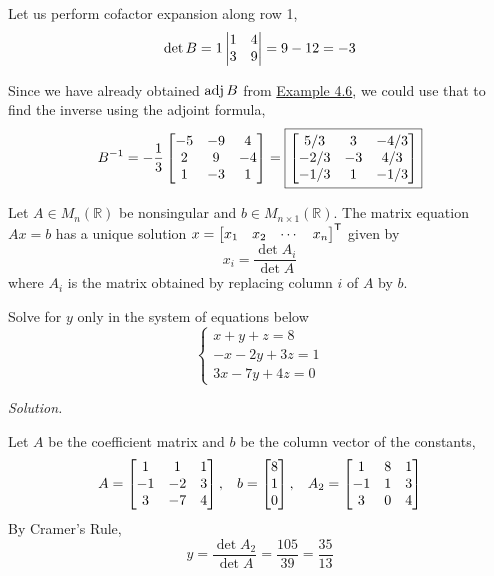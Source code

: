 Let us perform cofactor expansion along row 1,
$$\det B = 1 \begin{vmatrix} 1 & 4 \\ 3 & 9 \end{vmatrix} = 9 - 12 = -3$$

Since we have already obtained $\operatorname{adj} B$ from \hyperref[example:4.6]{Example 4.6}, we could use that to find the inverse using the adjoint formula,
$$B^{-1} = -\frac{1}{3}\begin{bmatrix} -5 & -9 & 4 \\ 2 & 9 & -4 \\ 1 & -3 & 1 \end{bmatrix}=\boxed{\begin{bmatrix} 5/3 & 3 & -4/3 \\ -2/3 & -3 & 4/3 \\ -1/3 & 1 & -1/3 \end{bmatrix}}$$

\begin{theorem}
Let $A \in M_n(\mathbb{R})$ be nonsingular and $b \in M_{n \times 1}(\mathbb{R})$. The matrix equation $Ax = b$ has a unique solution $\displaystyle x = \begin{bmatrix} x_1 & x_2 & \cdots & x_n \end{bmatrix}^{\mathsf{T}}$ given by
$$x_i = \frac{\det A_i}{\det A}$$
where $A_i$ is the matrix obtained by replacing column $i$ of $A$ by $b$.
\end{theorem}

\begin{example}
Solve for $y$ only in the system of equations below
$$\begin{cases}
    x + y + z = 8 \\
    -x - 2y + 3z = 1 \\
    3x - 7y + 4z = 0
\end{cases}$$
\end{example}

\textit{Solution.}

Let $A$ be the coefficient matrix and $b$ be the column vector of the constants,
$$A = \begin{bmatrix} 
1 & 1 & 1 \\
-1 & -2 & 3 \\
3 & -7 & 4
 \end{bmatrix}, \hspace{0.3cm} b = \begin{bmatrix} 
8 \\ 1 \\ 0
 \end{bmatrix}, \hspace{0.3cm} A_2 = \begin{bmatrix} 1 & 8 & 1 \\ -1 & 1 & 3 \\ 3 & 0 & 4 \end{bmatrix}
$$
By Cramer's Rule,
$$y = \frac{\det A_2}{\det A} = \frac{105}{39} = \boxed{\frac{35}{13}}$$
